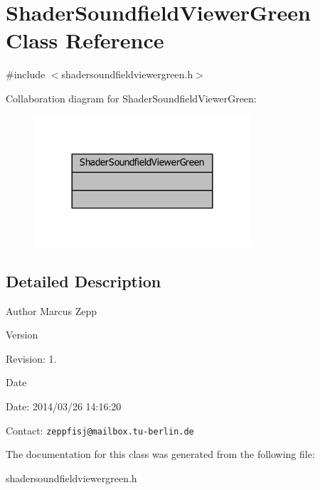\section{Shader\-Soundfield\-Viewer\-Green Class Reference}
\label{classShaderSoundfieldViewerGreen}


{\ttfamily \#include $<$shadersoundfieldviewergreen.\-h$>$}



Collaboration diagram for Shader\-Soundfield\-Viewer\-Green\-:
\nopagebreak
\begin{figure}[H]
\begin{center}
\leavevmode
\includegraphics[width=228pt]{d1/d56/classShaderSoundfieldViewerGreen__coll__graph}
\end{center}
\end{figure}


\subsection{Detailed Description}
\begin{DoxyAuthor}{Author}
Marcus Zepp
\end{DoxyAuthor}
\begin{DoxyVersion}{Version}

\end{DoxyVersion}
\begin{DoxyParagraph}{Revision\-:}
1. 
\end{DoxyParagraph}


\begin{DoxyDate}{Date}

\end{DoxyDate}
\begin{DoxyParagraph}{Date\-:}
2014/03/26 14\-:16\-:20 
\end{DoxyParagraph}


Contact\-: {\tt zeppfisj@mailbox.\-tu-\/berlin.\-de} 

The documentation for this class was generated from the following file\-:\begin{DoxyCompactItemize}
\item 
shadersoundfieldviewergreen.\-h\end{DoxyCompactItemize}
